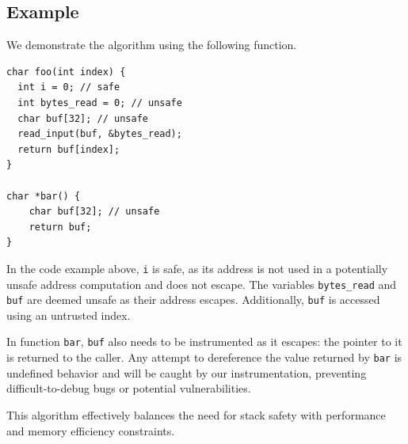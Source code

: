 \subsection{Example}
\label{subsec:example2}

We demonstrate the algorithm using the following function.

\begin{lstlisting}[frame=h,style=customc,
    label={lst:stack-safety}]
char foo(int index) {
  int i = 0; // safe
  int bytes_read = 0; // unsafe
  char buf[32]; // unsafe
  read_input(buf, &bytes_read);
  return buf[index];
}

char *bar() {
    char buf[32]; // unsafe
    return buf;
}
\end{lstlisting}

In the code example above, \texttt{i} is safe, as its address is not used in a potentially unsafe address computation and does not escape.
The variables \texttt{bytes\_read} and \texttt{buf} are deemed unsafe as their address escapes.
Additionally, \texttt{buf} is accessed using an untrusted index.

In function \texttt{bar}, \texttt{buf} also needs to be instrumented as it escapes: the pointer to it is returned to the caller.
Any attempt to dereference the value returned by \texttt{bar} is undefined behavior and will be caught by our instrumentation, preventing difficult-to-debug bugs or potential vulnerabilities.

\noindent
This algorithm effectively balances the need for stack safety with performance and memory efficiency constraints.
